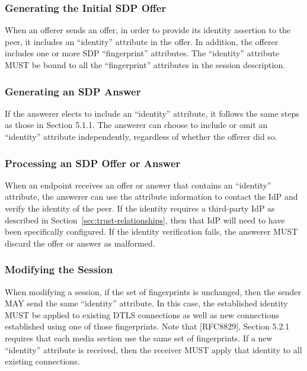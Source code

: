 \documentclass{article}
\begin{document}
\subsubsection{Generating the Initial SDP Offer}

When an offerer sends an offer, in order to provide its identity
assertion to the peer, it includes an ``identity'' attribute in the
offer.  In addition, the offerer includes one or more SDP
``fingerprint'' attributes.  The ``identity'' attribute MUST be bound to
all the ``fingerprint'' attributes in the session description.

\subsubsection{Generating an SDP Answer}

If the answerer elects to include an ``identity'' attribute, it follows
the same steps as those in Section 5.1.1.  The answerer can choose to
include or omit an ``identity'' attribute independently, regardless of
whether the offerer did so.

\subsubsection{Processing an SDP Offer or Answer}

When an endpoint receives an offer or answer that contains an
``identity'' attribute, the answerer can use the attribute information
to contact the IdP and verify the identity of the peer.  If the
identity requires a third-party IdP as described in Section~\ref{sec:trust-relationships}, then
that IdP will need to have been specifically configured.  If the
identity verification fails, the answerer MUST discard the offer or
answer as malformed.

\subsubsection{Modifying the Session}

When modifying a session, if the set of fingerprints is unchanged,
then the sender MAY send the same ``identity'' attribute.  In this
case, the established identity MUST be applied to existing DTLS
connections as well as new connections established using one of those
fingerprints.  Note that [RFC8829], Section 5.2.1 requires that each
media section use the same set of fingerprints.  If a new ``identity''
attribute is received, then the receiver MUST apply that identity to
all existing connections.
\end{document}
